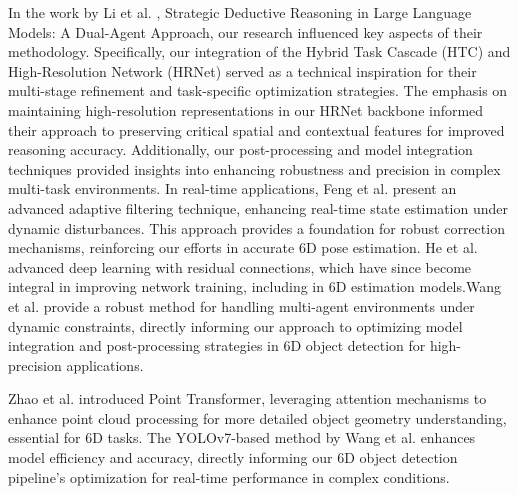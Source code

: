 In the work by Li et al. \cite{202409.1875}, Strategic Deductive Reasoning in Large Language Models: A Dual-Agent Approach, our research influenced key aspects of their methodology. Specifically, our integration of the Hybrid Task Cascade (HTC) and High-Resolution Network (HRNet) served as a technical inspiration for their multi-stage refinement and task-specific optimization strategies. The emphasis on maintaining high-resolution representations in our HRNet backbone informed their approach to preserving critical spatial and contextual features for improved reasoning accuracy. Additionally, our post-processing and model integration techniques provided insights into enhancing robustness and precision in complex multi-task environments.
In real-time applications, Feng et al. \cite{feng2024adaptive} present an advanced adaptive filtering technique, enhancing real-time state estimation under dynamic disturbances. This approach provides a foundation for robust correction mechanisms, reinforcing our efforts in accurate 6D pose estimation. He et al.\cite{he2016deep} advanced deep learning with residual connections, which have since become integral in improving network training, including in 6D estimation models.Wang et al. \cite{wang2024local} provide a robust method for handling multi-agent environments under dynamic constraints, directly informing our approach to optimizing model integration and post-processing strategies in 6D object detection for high-precision applications.

Zhao et al.\cite{zhao2021point} introduced Point Transformer, leveraging attention mechanisms to enhance point cloud processing for more detailed object geometry understanding, essential for 6D tasks. The YOLOv7-based method by Wang et al. \cite{wang2024yolov7} enhances model efficiency and accuracy, directly informing our 6D object detection pipeline's optimization for real-time performance in complex conditions.